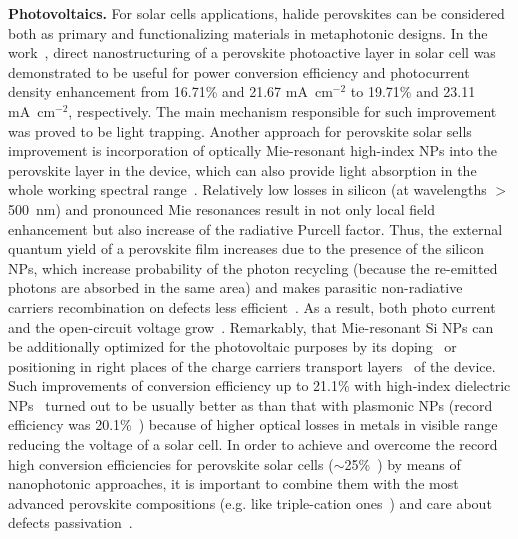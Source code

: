 \documentclass[journal=chreay,manuscript=review]{achemso}
\begin{document}
\textbf{Photovoltaics.}
For solar cells applications, halide perovskites can be considered both as primary and functionalizing materials in metaphotonic designs. In the work~\cite{wang2018diffraction}, direct nanostructuring of a perovskite photoactive layer in solar cell was demonstrated to be useful for power conversion efficiency and photocurrent density enhancement from 16.71\% and 21.67 mA~cm$^{-2}$ to 19.71\% and 23.11 mA~cm$^{-2}$, respectively. The main mechanism responsible for such improvement was proved to be light trapping. Another approach for perovskite solar sells improvement is incorporation of optically Mie-resonant high-index NPs into the perovskite layer in the device, which can also provide light absorption in the whole working spectral range~\cite{furasova2018resonant}. Relatively low losses in silicon (at wavelengths $>$500~nm) and pronounced Mie resonances result in not only local field enhancement but also increase of the radiative Purcell factor. Thus, the external quantum yield of a perovskite film increases due to the presence of the silicon NPs, which increase probability of the photon recycling (because the re-emitted photons are absorbed in the same area) and makes parasitic non-radiative carriers recombination on defects less efficient~\cite{dequilettes2019charge}. As a result, both photo current and the open-circuit voltage grow~\cite{furasova2018resonant}. Remarkably, that Mie-resonant Si NPs can be additionally optimized for the photovoltaic purposes by its doping~\cite{furasova2020engineering} or positioning in right places of the charge carriers transport layers~\cite{furasova2021mie} of the device. Such improvements of conversion efficiency up to 21.1\% with high-index dielectric NPs~\cite{furasova2021mie} turned out to be usually better as than that with plasmonic NPs (record efficiency was 20.1\%~\cite{zhao2020enhanced}) because of higher optical losses in metals in visible range reducing the voltage of a solar cell. In order to achieve and overcome the record high conversion efficiencies for perovskite solar cells ($\sim$25\%~\cite{NREL}) by means of nanophotonic approaches, it is important to combine them with the most advanced perovskite compositions (e.g. like triple-cation ones~\cite{saliba2016cesium}) and care about defects passivation~\cite{gao2020recent}.
\end{document}
